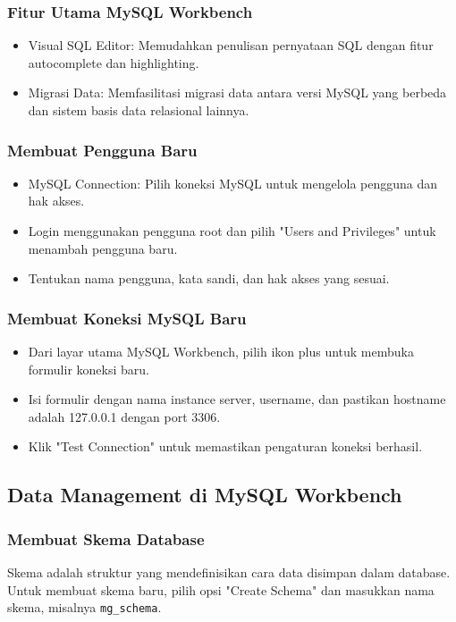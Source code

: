 \documentclass{article}
\begin{document}
\subsubsection{Fitur Utama MySQL Workbench}
\begin{itemize}
    \item Visual SQL Editor: Memudahkan penulisan pernyataan SQL dengan fitur autocomplete dan highlighting.
    \item Migrasi Data: Memfasilitasi migrasi data antara versi MySQL yang berbeda dan sistem basis data relasional lainnya.
\end{itemize}

\subsubsection{Membuat Pengguna Baru}
\begin{itemize}
    \item MySQL Connection: Pilih koneksi MySQL untuk mengelola pengguna dan hak akses.
    \item Login menggunakan pengguna root dan pilih "Users and Privileges" untuk menambah pengguna baru.
    \item Tentukan nama pengguna, kata sandi, dan hak akses yang sesuai.
\end{itemize}

\subsubsection{Membuat Koneksi MySQL Baru}
\begin{itemize}
    \item Dari layar utama MySQL Workbench, pilih ikon plus untuk membuka formulir koneksi baru.
    \item Isi formulir dengan nama instance server, username, dan pastikan hostname adalah 127.0.0.1 dengan port 3306.
    \item Klik "Test Connection" untuk memastikan pengaturan koneksi berhasil.
\end{itemize}

\subsection{Data Management di MySQL Workbench}
\subsubsection{Membuat Skema Database}
Skema adalah struktur yang mendefinisikan cara data disimpan dalam database. Untuk membuat skema baru, pilih opsi "Create Schema" dan masukkan nama skema, misalnya \verb|mg_schema|.
\end{document}
